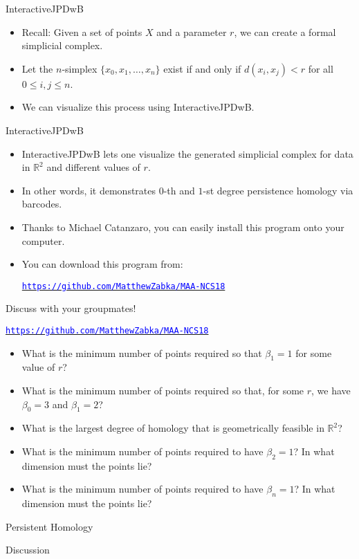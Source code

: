 \begin{frame}{InteractiveJPDwB}
\begin{itemize}
\item Recall: Given a set of points $X$ and a parameter $r$, we can create a formal simplicial complex.
\item Let the $n$-simplex $\{x_0, x_1, \ldots, x_n\}$ exist if and only if $d(x_i, x_j) < r$ for all $0 \leq i,j\leq n$. 
\item We can visualize this process using InteractiveJPDwB.
\end{itemize}
\end{frame}

\begin{frame}{InteractiveJPDwB}
\begin{itemize}
\item InteractiveJPDwB \cite{Wolcott2016InteractiveJPDwB} lets one visualize the generated simplicial complex for data in $\mathbb{R}^2$ and different values of $r$.
\item In other words, it demonstrates $0$-th and $1$-st degree persistence homology via barcodes.
\item Thanks to Michael Catanzaro, you can easily install this program onto your computer.
\item You can download this program from:
\begin{center}
\hyperref[https://github.com/MatthewZabka/MAA-NCS18]{\textcolor{blue}{\texttt{https://github.com/MatthewZabka/MAA-NCS18}}}
\end{center}
\end{itemize}
\end{frame}
\begin{frame}{Discuss with your groupmates!}
\begin{center}
\hyperref[https://github.com/MatthewZabka/MAA-NCS18]{\textcolor{blue}{\texttt{https://github.com/MatthewZabka/MAA-NCS18}}}
\end{center}
\begin{itemize}
\item What is the minimum number of points required so that $\beta_1 = 1$ for some value of $r$?
\item What is the minimum number of points required so that, for some $r$, we have $\beta_0 = 3$ and $\beta_1 = 2$?
\item What is the largest degree of homology that is geometrically feasible in $\mathbb{R}^2$?
\item What is the minimum number of points required to have $\beta_2 = 1$? In what dimension must the points lie?
\item What is the minimum number of points required to have $\beta_n = 1$?  In what dimension must the points lie?
\end{itemize}
\end{frame}
\begin{frame}{Persistent Homology}
\begin{center}
{\Huge Discussion}
\end{center}
\end{frame}
